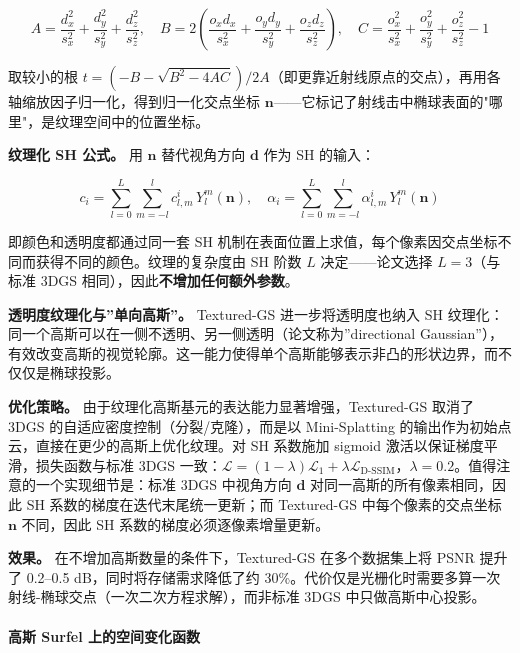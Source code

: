\begin{equation}
A = \frac{d_x^2}{s_x^2} + \frac{d_y^2}{s_y^2} + \frac{d_z^2}{s_z^2}, \quad
B = 2\left(\frac{o_x d_x}{s_x^2} + \frac{o_y d_y}{s_y^2} + \frac{o_z d_z}{s_z^2}\right), \quad
C = \frac{o_x^2}{s_x^2} + \frac{o_y^2}{s_y^2} + \frac{o_z^2}{s_z^2} - 1
\end{equation}

取较小的根 $t = (-B - \sqrt{B^2 - 4AC}) / 2A$（即更靠近射线原点的交点），再用各轴缩放因子归一化，得到归一化交点坐标 $\mathbf{n}$——它标记了射线击中椭球表面的"哪里"，是纹理空间中的位置坐标。

\textbf{纹理化 SH 公式。} 用 $\mathbf{n}$ 替代视角方向 $\mathbf{d}$ 作为 SH 的输入：

\begin{equation}
c_i = \sum_{l=0}^{L} \sum_{m=-l}^{l} c_{l,m}^i \, Y_l^m(\mathbf{n}), \quad
\alpha_i = \sum_{l=0}^{L} \sum_{m=-l}^{l} \alpha_{l,m}^i \, Y_l^m(\mathbf{n})
\end{equation}

即颜色和透明度都通过同一套 SH 机制在表面位置上求值，每个像素因交点坐标不同而获得不同的颜色。纹理的复杂度由 SH 阶数 $L$ 决定——论文选择 $L=3$（与标准 3DGS 相同），因此\textbf{不增加任何额外参数}。

\textbf{透明度纹理化与”单向高斯”。} Textured-GS 进一步将透明度也纳入 SH 纹理化：同一个高斯可以在一侧不透明、另一侧透明（论文称为”directional Gaussian”），有效改变高斯的视觉轮廓。这一能力使得单个高斯能够表示非凸的形状边界，而不仅仅是椭球投影。

\textbf{优化策略。} 由于纹理化高斯基元的表达能力显著增强，Textured-GS 取消了 3DGS 的自适应密度控制（分裂/克隆），而是以 Mini-Splatting 的输出作为初始点云，直接在更少的高斯上优化纹理。对 SH 系数施加 sigmoid 激活以保证梯度平滑，损失函数与标准 3DGS 一致：$\mathcal{L} = (1-\lambda)\mathcal{L}_1 + \lambda\mathcal{L}_{\text{D-SSIM}}$，$\lambda=0.2$。值得注意的一个实现细节是：标准 3DGS 中视角方向 $\mathbf{d}$ 对同一高斯的所有像素相同，因此 SH 系数的梯度在迭代末尾统一更新；而 Textured-GS 中每个像素的交点坐标 $\mathbf{n}$ 不同，因此 SH 系数的梯度必须逐像素增量更新。

\textbf{效果。} 在不增加高斯数量的条件下，Textured-GS 在多个数据集上将 PSNR 提升了 0.2--0.5 dB，同时将存储需求降低了约 30\%。代价仅是光栅化时需要多算一次射线-椭球交点（一次二次方程求解），而非标准 3DGS 中只做高斯中心投影。

\paragraph{高斯 Surfel 上的空间变化函数}

